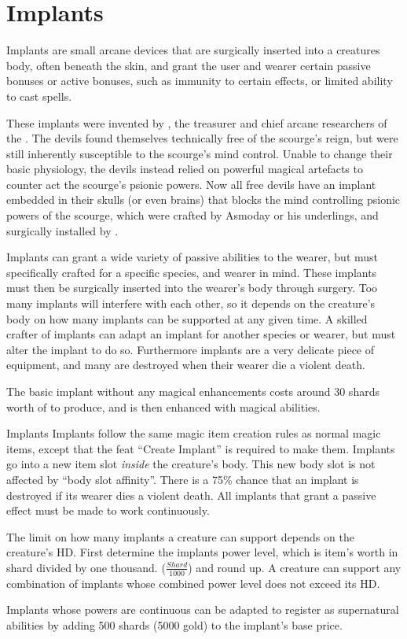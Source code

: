 \section{Implants}
\label{sec:Implants}

Implants are small arcane devices that are surgically inserted into a
creatures body, often beneath the skin, and grant the user and wearer certain
passive bonuses or active bonuses, such as immunity to certain effects, or
limited ability to cast spells.

These implants were invented by , the treasurer and chief
arcane researchers of the . The devils found themselves
technically free of the scourge's reign, but were still inherently susceptible
to the scourge's mind control. Unable to change their basic physiology, the
devils instead relied on powerful magical artefacts to counter act the
scourge's psionic powers. Now all free devils have an implant embedded in
their skulls (or even brains) that blocks the mind controlling psionic powers
of the scourge, which were crafted by Asmoday or his underlings, and
surgically installed by .

Implants can grant a wide variety of passive abilities to the wearer, but must
specifically crafted for a specific species, and wearer in mind. These implants
must then be surgically inserted into the wearer's body through surgery. Too
many implants will interfere with each other, so it depends on the creature's
body on how many implants can be supported at any given time. A skilled
crafter of implants can adapt an implant for another species or wearer, but must
alter the implant to do so. Furthermore implants are a very delicate piece of
equipment, and many are destroyed when their wearer die a violent death.

The basic implant without any magical enhancements costs around 30 shards
worth of  to produce, and is then enhanced with magical
abilities.

\begin{35e}{Implants}
  Implants follow the same magic item creation rules as normal magic items,
  except that the feat ``Create Implant'' is required to make them. Implants go
  into a new item slot \emph{inside} the creature's body. This new body slot is
  not affected by ``body slot affinity''. There is a 75\% chance that an implant
  is destroyed if its wearer dies a violent death. All implants that grant a
  passive effect must be made to work continuously.

  The limit on how many implants a creature can support depends on the
  creature's HD. First determine the implants power level, which is item's
  worth in shard divided by one thousand. ($ \frac{Shard}{1000} $) and round
  up. A creature can support any combination of implants whose combined power
  level does not exceed its HD.

  Implants whose powers are continuous can be adapted to register as
  supernatural abilities by adding 500 shards (5000 gold) to the implant's
  base price.
\end{35e}

